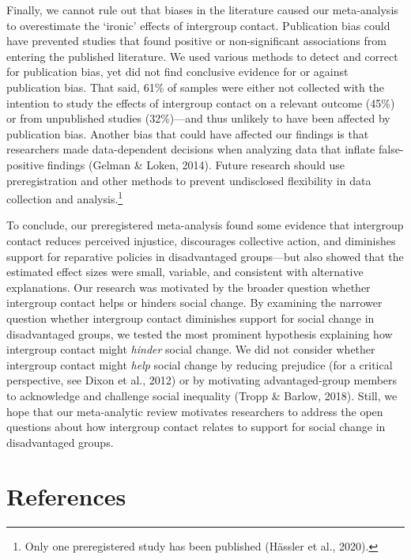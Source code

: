 \documentclass[12pt, letterpaper]{article}
\begin{document}
Finally, we cannot rule out that biases in the literature caused our
meta-analysis to overestimate the `ironic' effects of intergroup
contact. Publication bias could have prevented studies that found
positive or non-significant associations from entering the published
literature. We used various methods to detect and correct for
publication bias, yet did not find conclusive evidence for or against
publication bias. That said, 61\% of samples were either not collected
with the intention to study the effects of intergroup contact on a
relevant outcome (45\%) or from unpublished studies (32\%)---and thus
unlikely to have been affected by publication bias. Another bias that
could have affected our findings is that researchers made data-dependent
decisions when analyzing data that inflate false-positive findings
(Gelman \& Loken, 2014). Future research should use preregistration and
other methods to prevent undisclosed flexibility in data collection and
analysis.\footnote{Only one preregistered study has been published
  (Hässler et al., 2020).}

To conclude, our preregistered meta-analysis found some evidence that
intergroup contact reduces perceived injustice, discourages collective
action, and diminishes support for reparative policies in disadvantaged
groups---but also showed that the estimated effect sizes were small,
variable, and consistent with alternative explanations. Our research was
motivated by the broader question whether intergroup contact helps or
hinders social change. By examining the narrower question whether
intergroup contact diminishes support for social change in disadvantaged
groups, we tested the most prominent hypothesis explaining how
intergroup contact might \emph{hinder} social change. We did not
consider whether intergroup contact might \emph{help} social change by
reducing prejudice (for a critical perspective, see Dixon et al., 2012)
or by motivating advantaged-group members to acknowledge and challenge
social inequality (Tropp \& Barlow, 2018). Still, we hope that our
meta-analytic review motivates researchers to address the open questions
about how intergroup contact relates to support for social change in
disadvantaged groups.

\newpage

\hypertarget{references}{%
\section{References}\label{references}}

\begingroup
\end{document}
